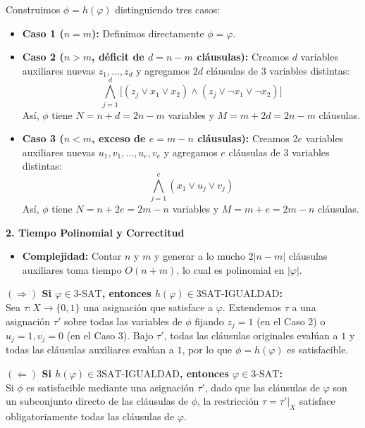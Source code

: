 Construimos $\phi = h(\varphi)$ distinguiendo tres casos:

\begin{itemize}[leftmargin=*]
    \item \textbf{Caso 1 ($n = m$):} Definimos directamente $\phi = \varphi$.

    \item \textbf{Caso 2 ($n > m$, déficit de $d = n - m$ cláusulas):} Creamos $d$ variables auxiliares nuevas $z_1, \dots, z_d$ y agregamos $2d$ cláusulas de $3$ variables distintas:
    \[ \bigwedge_{j=1}^{d} \Big[ (z_j \lor x_1 \lor x_2) \land (z_j \lor \neg x_1 \lor \neg x_2) \Big] \]
    Así, $\phi$ tiene $N = n + d = 2n - m$ variables y $M = m + 2d = 2n - m$ cláusulas.

    \item \textbf{Caso 3 ($n < m$, exceso de $e = m - n$ cláusulas):} Creamos $2e$ variables auxiliares nuevas $u_1, v_1, \dots, u_e, v_e$ y agregamos $e$ cláusulas de $3$ variables distintas:
    \[ \bigwedge_{j=1}^{e} (x_1 \lor u_j \lor v_j) \]
    Así, $\phi$ tiene $N = n + 2e = 2m - n$ variables y $M = m + e = 2m - n$ cláusulas.
\end{itemize}

\vspace{0.3cm}
\noindent\textbf{2. Tiempo Polinomial y Correctitud}

\begin{itemize}[leftmargin=*]
    \item \textbf{Complejidad:} Contar $n$ y $m$ y generar a lo mucho $2|n - m|$ cláusulas auxiliares toma tiempo \textbf{$O(n + m)$}, lo cual es polinomial en $|\varphi|$.
\end{itemize}

\vspace{0.2cm}
\noindent\textbf{$(\Rightarrow)$ Si $\varphi \in \text{3-SAT}$, entonces $h(\varphi) \in \text{3SAT-IGUALDAD}$:}\\
Sea $\tau: X \to \{0, 1\}$ una asignación que satisface a $\varphi$. Extendemos $\tau$ a una asignación $\tau'$ sobre todas las variables de $\phi$ fijando $z_j = 1$ (en el Caso 2) o $u_j = 1, v_j = 0$ (en el Caso 3). Bajo $\tau'$, todas las cláusulas originales evalúan a $1$ y todas las cláusulas auxiliares evalúan a $1$, por lo que $\phi = h(\varphi)$ es satisfacible.

\vspace{0.2cm}
\noindent\textbf{$(\Leftarrow)$ Si $h(\varphi) \in \text{3SAT-IGUALDAD}$, entonces $\varphi \in \text{3-SAT}$:}\\
Si $\phi$ es satisfacible mediante una asignación $\tau'$, dado que las cláusulas de $\varphi$ son un subconjunto directo de las cláusulas de $\phi$, la restricción $\tau = \tau'|_X$ satisface obligatoriamente todas las cláusulas de $\varphi$.

